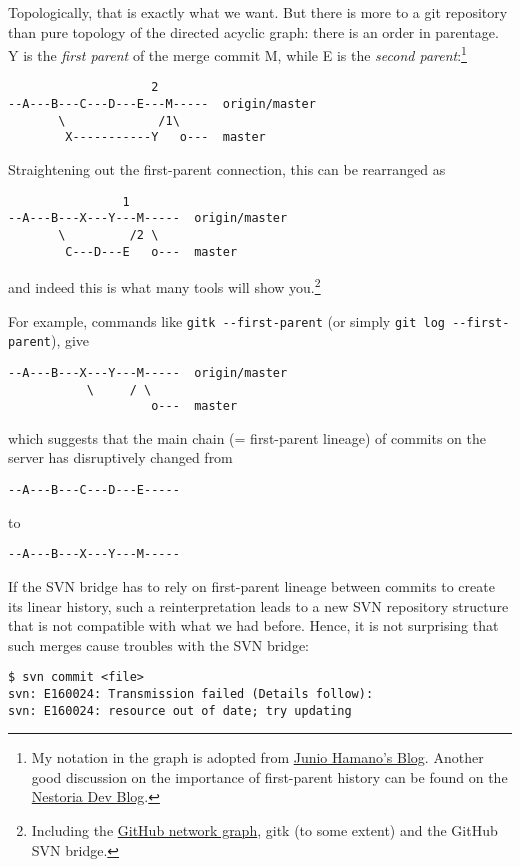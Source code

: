 \documentclass[12pt,pdftex]{article}
\begin{document}
Topologically, that is exactly what we want.
But there is more to a git repository than pure topology of the
directed acyclic graph: there is an order in parentage.
Y is the \emph{first parent} of the merge commit M, while E is the \emph{second
parent}:\footnote{My notation in the graph is adopted from
\href{http://git-blame.blogspot.de/2015/03/fun-with-non-fast-forward.html}{Junio Hamano's Blog}.
Another good discussion on the importance of first-parent history can
be found on the \href{http://devblog.nestoria.com/post/98892582763/maintaining-a-consistent-linear-history-for-git}{Nestoria Dev Blog}.}
\begin{verbatim}
                    2
--A---B---C---D---E---M-----  origin/master
       \             /1\
        X-----------Y   o---  master
\end{verbatim}

Straightening out the first-parent connection, this can be rearranged as
\begin{verbatim}
                1
--A---B---X---Y---M-----  origin/master
       \         /2 \
        C---D---E   o---  master
\end{verbatim}
and indeed this is what many tools will show you.\footnote{Including the \href{https://github.com/pencil-code/pencil-code/network}{GitHub network graph}, gitk (to some extent) and the
GitHub SVN bridge.}

For example, commands like \texttt{gitk -{}-first-parent} (or simply \texttt{git log
  -{}-first-parent}), give
\begin{verbatim}
--A---B---X---Y---M-----  origin/master
           \     / \
                    o---  master
\end{verbatim}
which suggests that the main chain (= first-parent lineage) of commits
on the server has disruptively changed from
\begin{verbatim}
--A---B---C---D---E-----
\end{verbatim}
to
\begin{verbatim}
--A---B---X---Y---M-----
\end{verbatim}

If the SVN bridge has to rely on first-parent lineage between commits to
create its linear history, such a reinterpretation leads to a new SVN
repository structure that is not compatible with what we had before.
Hence, it is not surprising that such merges cause troubles with the SVN
bridge:
\begin{verbatim}
$ svn commit <file>
svn: E160024: Transmission failed (Details follow):
svn: E160024: resource out of date; try updating
\end{verbatim}
\end{document}
